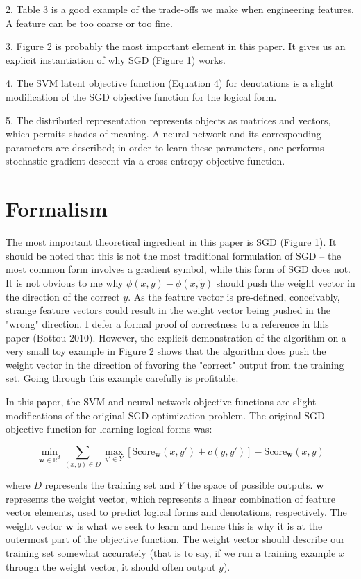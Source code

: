 \documentclass[twoside]{article}
\theoremstyle{definition}
\theoremstyle{definition}
\theoremstyle{remark}
\def\R{{\mathbb R}}
\begin{document}
2. Table 3 is a good example of the trade-offs we make when engineering features. A feature
can be too coarse or too fine.

3. Figure 2 is probably the most important element in this paper. It gives us an explicit
instantiation of why SGD (Figure 1) works.

4. The SVM latent objective function (Equation 4) for denotations 
is a slight modification of the SGD objective function for the logical form.

5. The distributed representation represents objects as matrices and vectors, which
permits shades of meaning. A neural network and its corresponding parameters are described;
in order to learn these parameters, one performs stochastic gradient descent via
a cross-entropy objective function.

\section{Formalism}

The most important theoretical ingredient in this paper is SGD (Figure 1). It should be noted
that this is not the most traditional formulation of SGD -- the most common form 
involves a gradient symbol, while this form of SGD does not. It is not 
obvious to me why $\phi(x,y) - \phi(x,\tilde{y})$ should push the weight vector
in the direction of the correct $y$. As the feature vector is pre-defined, conceivably,
strange feature vectors could result in the weight vector being pushed in the "wrong" direction. 
I defer a formal proof of correctness to a reference in this paper (Bottou 2010). However, the explicit demonstration of the algorithm on a very small toy example
in Figure 2 shows that the algorithm does push the weight vector in the direction
of favoring the "correct" output from the training set. Going through this 
example carefully is profitable. 

In this paper, the SVM and neural network
objective functions are slight modifications of the original SGD optimization problem.
The original SGD objective function for learning logical forms was:

\[
  \min_{\textbf{w} \in \R^d} \sum_{(x,y) \in D} \max_{y' \in Y}[\textrm{Score}_{\textbf{w}}(x,y') + c(y,y')] - \textrm{Score}_{\textbf{w}}(x,y)
\]

where $D$ represents the training set and $Y$ the space of possible outputs. $\textbf{w}$
represents the weight vector, which represents a linear combination of feature
vector elements, used to predict logical forms and denotations, respectively. The weight
vector $\textbf{w}$ is what we seek to learn and hence this is why it is at the
outermost part of the objective function. The weight vector should describe our
training set somewhat accurately (that is to say, if we run a training example $x$ through
the weight vector, it should often output $y$).
\end{document}
